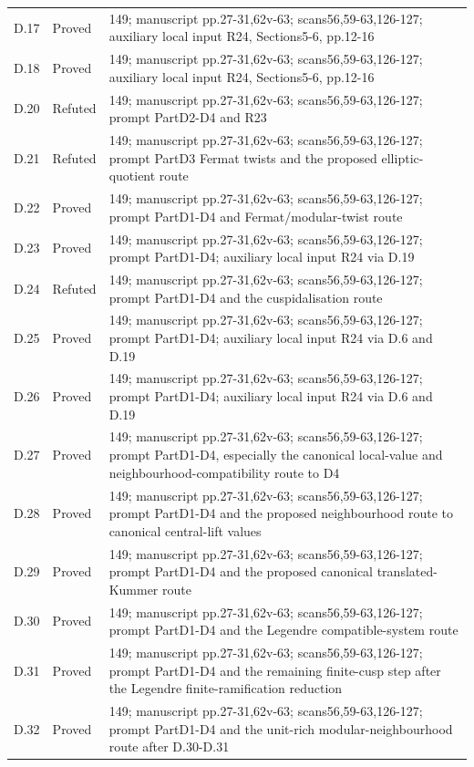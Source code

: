 {\begin{longtable}{p{1.9cm}p{1.7cm}p{10.3cm}}
D.17 & Proved & 149; manuscript pp.27-31,62v-63; scans56,59-63,126-127; auxiliary local input R24, Sections5-6, pp.12-16 \\
D.18 & Proved & 149; manuscript pp.27-31,62v-63; scans56,59-63,126-127; auxiliary local input R24, Sections5-6, pp.12-16 \\
D.20 & Refuted & 149; manuscript pp.27-31,62v-63; scans56,59-63,126-127; prompt PartD2-D4 and R23 \\
D.21 & Refuted & 149; manuscript pp.27-31,62v-63; scans56,59-63,126-127; prompt PartD3 Fermat twists and the proposed elliptic-quotient route \\
D.22 & Proved & 149; manuscript pp.27-31,62v-63; scans56,59-63,126-127; prompt PartD1-D4 and Fermat/modular-twist route \\
D.23 & Proved & 149; manuscript pp.27-31,62v-63; scans56,59-63,126-127; prompt PartD1-D4; auxiliary local input R24 via D.19 \\
D.24 & Refuted & 149; manuscript pp.27-31,62v-63; scans56,59-63,126-127; prompt PartD1-D4 and the cuspidalisation route \\
D.25 & Proved & 149; manuscript pp.27-31,62v-63; scans56,59-63,126-127; prompt PartD1-D4; auxiliary local input R24 via D.6 and D.19 \\
D.26 & Proved & 149; manuscript pp.27-31,62v-63; scans56,59-63,126-127; prompt PartD1-D4; auxiliary local input R24 via D.6 and D.19 \\
D.27 & Proved & 149; manuscript pp.27-31,62v-63; scans56,59-63,126-127; prompt PartD1-D4, especially the canonical local-value and neighbourhood-compatibility route to D4 \\
D.28 & Proved & 149; manuscript pp.27-31,62v-63; scans56,59-63,126-127; prompt PartD1-D4 and the proposed neighbourhood route to canonical central-lift values \\
D.29 & Proved & 149; manuscript pp.27-31,62v-63; scans56,59-63,126-127; prompt PartD1-D4 and the proposed canonical translated-Kummer route \\
D.30 & Proved & 149; manuscript pp.27-31,62v-63; scans56,59-63,126-127; prompt PartD1-D4 and the Legendre compatible-system route \\
D.31 & Proved & 149; manuscript pp.27-31,62v-63; scans56,59-63,126-127; prompt PartD1-D4 and the remaining finite-cusp step after the Legendre finite-ramification reduction \\
D.32 & Proved & 149; manuscript pp.27-31,62v-63; scans56,59-63,126-127; prompt PartD1-D4 and the unit-rich modular-neighbourhood route after D.30-D.31 \\

\end{longtable}}
